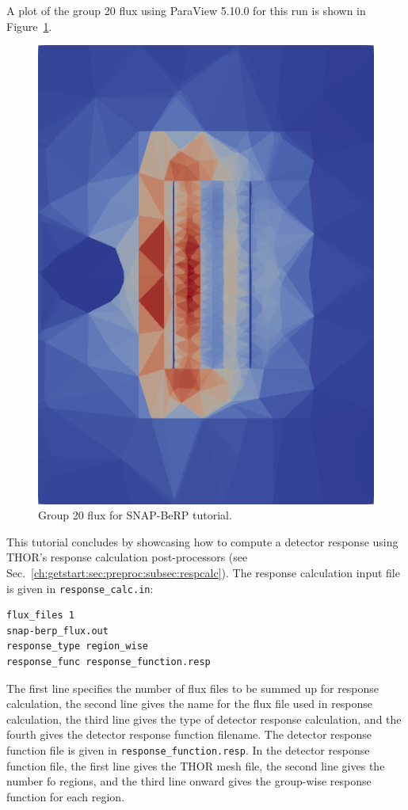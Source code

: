 A plot of the group 20 flux using ParaView 5.10.0 for this run is shown in Figure~\ref{fig:berp_g=20}.
\begin{figure}[th]
  \center
  \includegraphics[height=1.0\textwidth, angle=-90]{chapters/tutorials/figures/berp_g=20.png}
  \caption{Group 20 flux for SNAP-BeRP tutorial.}
  \label{fig:berp_g=20}
\end{figure}

This tutorial concludes by showcasing how to compute a detector response using THOR's response calculation post-processors (see Sec.~\ref{ch:getstart:sec:preproc:subsec:respcalc}).
The response calculation input file is given in \verb"response_calc.in":
\begin{verbatim}
flux_files 1
snap-berp_flux.out
response_type region_wise
response_func response_function.resp
\end{verbatim}

The first line specifies the number of flux files to be summed up for response calculation, the second line gives the name for the flux file used in response calculation, the third line gives the type of detector response calculation, and the fourth gives the detector response function filename.
The detector response function file is given in \verb"response_function.resp".
In the detector response function file, the first line gives the THOR mesh file, the second line gives the number fo regions, and the third line onward gives the group-wise response function for each region.

